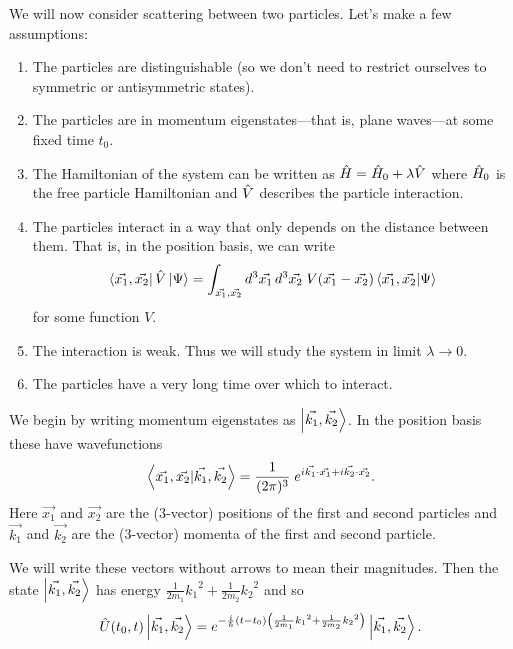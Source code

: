 
We will now consider scattering between two particles. Let's make a few assumptions:

\begin{enumerate}
\item The particles are distinguishable (so we don't need to restrict ourselves to symmetric or antisymmetric states).
\item The particles are in momentum eigenstates---that is, plane waves---at some fixed time \(t_0\).
\item The Hamiltonian of the system can be written as \(\hat{H} = \hat{H}_0 + \lambda \hat{V}\) where \(\hat{H}_0\) is the free particle Hamiltonian and \(\hat{V}\) describes the particle interaction.
\item The particles interact in a way that only depends on the distance between them. That is, in the position basis, we can write
\begin{equation}\label{eq.Vposbasis}
\left\langle\vec{x_1}, \vec{x_2}\right|\hat{V}\left|\Psi\right\rangle = \int_{\vec{x_1},\vec{x_2}} {d^3 \vec{x_1} \,d^3\vec{x_2}}\; V(\vec{x_1} - \vec{x_2}) \left\langle\vec{x_1}, \vec{x_2}|\Psi\right\rangle
\end{equation}
for some function \(V\).
\item
The interaction is weak. Thus we will study the system in limit \(\lambda \to 0\).
\item
The particles have a very long time over which to interact.
\end{enumerate}

We begin by writing momentum eigenstates as \(\left|\vec{k_1}, \vec{k_2}\right\rangle\). In the position basis these have wavefunctions
\begin{equation}\label{eq.momentuminpos}
\left\langle\vec{x_1}, \vec{x_2}|\vec{k_1}, \vec{k_2}\right\rangle = \frac{1}{(2\pi)^3}\;e^{i\vec{k_1}\cdot \vec{x_1} + i\vec{k_2}\cdot \vec{x_2}}.
\end{equation}
Here \(\vec{x_1}\) and \(\vec{x_2}\) are the (3-vector) positions of the first and second particles and \(\vec{k_1}\) and \(\vec{k_2}\) are the (3-vector) momenta of the first and second particle.

We will write these vectors without arrows to mean their magnitudes.
Then the state \(\left|\vec{k_1}, \vec{k_2}\right\rangle\) has energy \(\frac{1}{2m_1}{k_1}^2 + \frac{1}{2m_2}{k_2}^2\) and so
\begin{equation}
\label{eq.timeevonk}
\hat{U}(t_0, t) \left|\vec{k_1}, \vec{k_2}\right\rangle = e^{-\frac{i}{\hbar}\left(t-t_0\right)\left(\frac{1}{2m_1}{k_1}^2 + \frac{1}{2m_2}{k_2}^2\right)} \left|\vec{k_1}, \vec{k_2}\right\rangle.
\end{equation}

